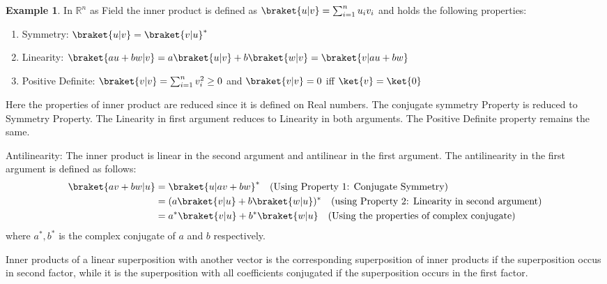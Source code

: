 \documentclass[12pt, oneside]{book}
\theoremstyle{definition}
\theoremstyle{definition}
\newtheorem{example}{Example}[section]
\theoremstyle{remark}
\begin{document}
\begin{example}
    In $\mathbb{R}^n$ as Field the inner product is defined as $\braket{u|v}=\sum_{i=1}^{n}u_iv_i$
    and holds the following properties:
    \begin{enumerate}
        \item Symmetry: $\braket{u|v}=\braket{v|u}^*$
        \item Linearity: $\braket{au+bw|v}=a\braket{u|v}+b\braket{w|v}=\braket{v|au+bw}$
        \item Positive Definite: $\braket{v|v}=\sum_{i=1}^{n}v_i^2\geq 0$ and $\braket{v|v}=0$ iff $\ket{v}=\ket{0}$
    \end{enumerate}
    Here the properties of inner product are reduced since it is defined on Real numbers. The conjugate symmetry Property
    is reduced to Symmetry Property. The Linearity in first argument reduces to Linearity in both arguments. 
    The Positive Definite property remains the same.
\end{example}

Antilinearity: The inner product is linear in the second argument and antilinear in the first argument. The antilinearity in the first argument is defined as follows:
\begin{align*}
    \braket{av+bw|u}&=\braket{u|av+bw}^* \quad \text{(Using Property 1: Conjugate Symmetry)} \\
    &=(a\braket{v|u} + b\braket{w|u} )^* \quad \text{(using Property 2: Linearity in second argument)}\\
    &=a^*\braket{v|u}+b^*\braket{w|u} \quad \text{(Using the properties of complex conjugate)}\\
\end{align*}
where $a^*,b^*$ is the complex conjugate of $a$ and $b$ respectively. 

Inner products of a linear superposition with another vector is the corresponding superposition of inner products if the superposition
occus in second factor, while it is the superposition with all coefficients conjugated if the superposition occurs in the first factor.
\end{document}
